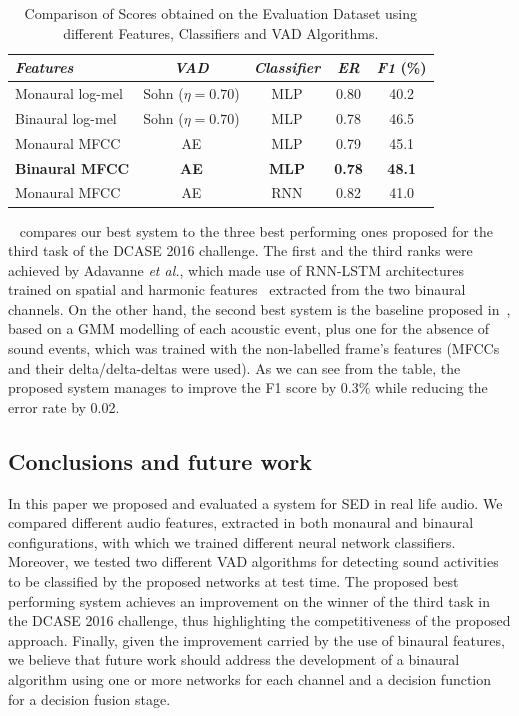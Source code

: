 \begin{table}[h]
	\centering
	\begin{tabular}{l c c c c}\toprule
		\emph{Features} & \emph{VAD} & \emph{Classifier} & \emph{ER} & \emph{F1} (\%)\\
		\midrule
		Monaural log-mel & Sohn ($\eta=0.70$) & MLP & 0.80 & 40.2\\
		Binaural log-mel & Sohn ($\eta=0.70$) & MLP & 0.78 & 46.5\\
		\midrule
		Monaural MFCC & AE & MLP & 0.79 & 45.1\\
		\textbf{Binaural MFCC} & \textbf{AE} & \textbf{MLP} & \textbf{0.78} & \textbf{48.1}\\
		\midrule
		Monaural MFCC & AE & RNN & 0.82 & 41.0\\
		\bottomrule
	\end{tabular}
	\caption[Sound Event Detection - DCASE 2016 - Best Results]{Comparison of Scores obtained on the Evaluation Dataset using different Features, Classifiers and VAD Algorithms.}
	\label{tab:eval_results}
\end{table}


~ compares our best system to the three best performing ones proposed for the third task of the DCASE 2016 challenge. The first and the third ranks were achieved by Adavanne \emph{et al.}, which made use of RNN-LSTM architectures trained on spatial and harmonic features~\cite{adavanne2016sound} extracted from the two binaural channels. On the other hand, the second best system is the baseline proposed in~\cite{mesaros2016tut}, based on a GMM modelling of each acoustic event, plus one for the absence of sound events, which was trained with the non-labelled frame's features (MFCCs and their delta/delta-deltas were used). As we can see from the table, the proposed system manages to improve the F1 score by 0.3\% while reducing the error rate by 0.02.

\subsection{Conclusions and future work}

In this paper we proposed and evaluated a system for SED in real life audio. We compared different audio features, extracted in both monaural and binaural configurations, with which we trained different neural network classifiers. Moreover, we tested two different VAD algorithms for detecting sound activities to be classified by the proposed networks at test time. The proposed best performing system achieves an improvement on the winner of the third task in the DCASE 2016 challenge, thus highlighting the competitiveness of the proposed approach. Finally, given the improvement carried by the use of binaural features, we believe that future work should address the development of a binaural algorithm using one or more networks for each channel and a decision function for a decision fusion stage.

